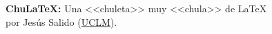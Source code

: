 \documentclass[10pt,landscape,a4paper]{article}
\begin{document}
\raggedright
\footnotesize
\begin{multicols}{3}


\setlength{\premulticols}{1pt}
\setlength{\postmulticols}{1pt}
\setlength{\multicolsep}{1pt}
\setlength{\columnsep}{2pt}

\begin{flushleft}
     {\Large\textbf{Chu\LaTeX:}} {\large Una <<chuleta>> muy <<chula>> de \LaTeX} \\[1.5mm]
     {\small por Jesús Salido (\href{http://visilab.etsii.uclm.es/?page_id=1468}{UCLM}).}
\end{flushleft}
\newlength{\MyLen}


\end{multicols}
\end{document}
